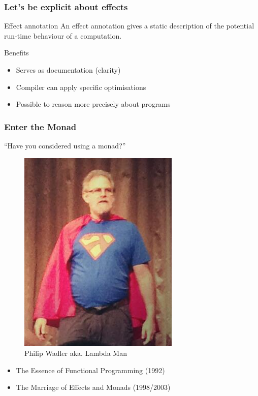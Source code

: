\begin{frame}
  \frametitle{Let's be explicit about effects}
  \begin{block}{Effect annotation}
    An effect annotation gives a static description of the potential run-time behaviour of a computation.
  \end{block}
  Benefits
  \begin{itemize}
    \item Serves as documentation (clarity)
    \item Compiler can apply specific optimisations
    \item Possible to reason more precisely about programs
  \end{itemize}
\end{frame}

\begin{frame}
  \frametitle{Enter the Monad}
  \begin{center}
    ``Have you considered using a monad?''
    \begin{figure}
      \includegraphics[scale=0.3]{figures/lambdaman.png}
      \caption{Philip Wadler aka. Lambda Man}
    \end{figure}
  \end{center}
\begin{itemize}
  \item The Essence of Functional Programming (1992)
  \item The Marriage of Effects and Monads (1998/2003)
\end{itemize}
\end{frame}

